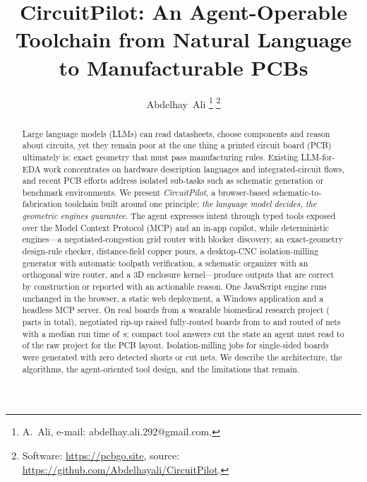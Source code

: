 \documentclass[journal]{IEEEtran}
\begin{document}
\title{CircuitPilot: An Agent-Operable Toolchain from Natural Language to Manufacturable PCBs}

\author{Abdelhay~Ali%
\thanks{A.~Ali, e-mail: abdelhay.ali.292@gmail.com.}%
\thanks{Software: \url{https://pcbgo.site}, source: \url{https://github.com/Abdelhayali/CircuitPilot}.}}


\maketitle

\begin{abstract}
Large language models (LLMs) can read datasheets, choose components and reason about circuits, yet they remain poor at the one thing a printed circuit board (PCB) ultimately is: exact geometry that must pass manufacturing rules. Existing LLM-for-EDA work concentrates on hardware description languages and integrated-circuit flows, and recent PCB efforts address isolated sub-tasks such as schematic generation or benchmark environments. We present \emph{CircuitPilot}, a browser-based schematic-to-fabrication toolchain built around one principle: \emph{the language model decides, the geometric engines guarantee}. The agent expresses intent through \ToolCount{} typed tools exposed over the Model Context Protocol (MCP) and an in-app copilot, while deterministic engines---a negotiated-congestion grid router with blocker discovery, an exact-geometry design-rule checker, distance-field copper pours, a desktop-CNC isolation-milling generator with automatic toolpath verification, a schematic organizer with an orthogonal wire router, and a 3D enclosure kernel---produce outputs that are correct by construction or reported with an actionable reason. One JavaScript engine runs unchanged in the browser, a static web deployment, a Windows application and a headless MCP server. On \DesignCount{} real boards from a wearable biomedical research project (\PartCount{} parts in total), negotiated rip-up raised fully-routed boards from \NoRipOk{} to \FullOk{} and routed \NetsFull{} of \NetsAll{} nets with a median run time of \MedSec{}\,s; compact tool answers cut the state an agent must read to \LayoutPct{} of the raw project for the PCB layout. Isolation-milling jobs for single-sided boards were generated with zero detected shorts or cut nets. We describe the architecture, the algorithms, the agent-oriented tool design, and the limitations that remain.
\end{abstract}
\end{document}
